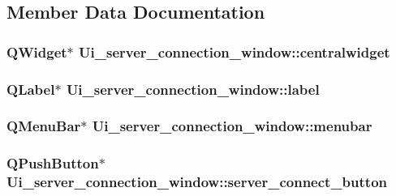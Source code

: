 \subsection{Member Data Documentation}
\hypertarget{classUi__server__connection__window_a9b76c80b2439ac5363c319758e13fdba}{
\subsubsection[{centralwidget}]{\setlength{\rightskip}{0pt plus 5cm}Q\-Widget$\ast$ Ui\-\_\-server\-\_\-connection\-\_\-window\-::centralwidget}}\label{classUi__server__connection__window_a9b76c80b2439ac5363c319758e13fdba}
\hypertarget{classUi__server__connection__window_a96edc08348d65093b103b9d0b1eaa024}{
\subsubsection[{label}]{\setlength{\rightskip}{0pt plus 5cm}Q\-Label$\ast$ Ui\-\_\-server\-\_\-connection\-\_\-window\-::label}}\label{classUi__server__connection__window_a96edc08348d65093b103b9d0b1eaa024}
\hypertarget{classUi__server__connection__window_abe650faec1c385db9a7ec4efa7f0bd88}{
\subsubsection[{menubar}]{\setlength{\rightskip}{0pt plus 5cm}Q\-Menu\-Bar$\ast$ Ui\-\_\-server\-\_\-connection\-\_\-window\-::menubar}}\label{classUi__server__connection__window_abe650faec1c385db9a7ec4efa7f0bd88}
\hypertarget{classUi__server__connection__window_a42b1801ba78d2d54b731f74a566d112b}{
\subsubsection[{server\-\_\-connect\-\_\-button}]{\setlength{\rightskip}{0pt plus 5cm}Q\-Push\-Button$\ast$ Ui\-\_\-server\-\_\-connection\-\_\-window\-::server\-\_\-connect\-\_\-button}}\label{classUi__server__connection__window_a42b1801ba78d2d54b731f74a566d112b}
